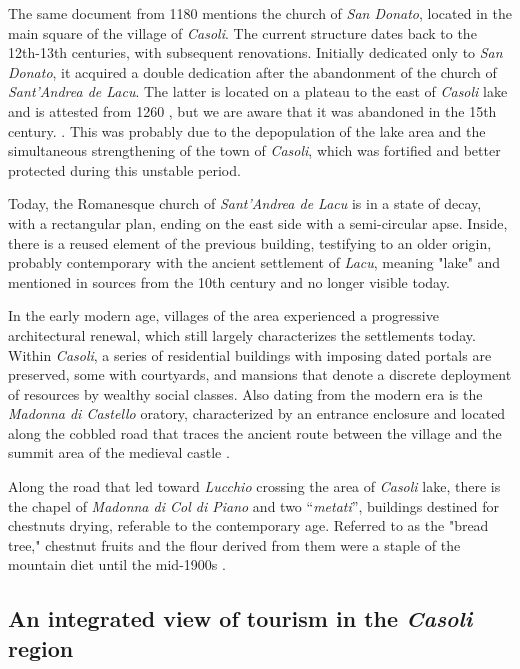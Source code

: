 \documentclass[sustainability,article,submit,pdftex,moreauthors]{Definitions/mdpi}
\begin{document}
The same document from 1180 mentions the church of \textit{San Donato}, located in the main square of the village of \emph{Casoli}. The current structure dates back to the 12th-13th centuries, with subsequent renovations. Initially dedicated only to \textit{San Donato}, it acquired a double dedication after the abandonment of the church of \textit{Sant'Andrea de Lacu}. The latter is located on a plateau to the east of \emph{Casoli} lake and is attested from 1260 \cite{ber18, gia96, cap17}, but we are aware that it was abandoned in the 15th century. \cite{gia96, con12}. This was probably due to the depopulation of the lake area and the simultaneous strengthening of the town of \emph{Casoli}, which was fortified and better protected during this unstable period.

Today, the Romanesque church of \textit{Sant'Andrea de Lacu} is in a state of decay, with a rectangular plan, ending on the east side with a semi-circular apse. Inside, there is a reused element of the previous building, testifying to an older origin, probably contemporary with the ancient settlement of \textit{Lacu}, meaning "lake" and mentioned in sources from the 10th century and no longer visible today.

In the early modern age, villages of the area experienced a progressive architectural renewal, which still largely characterizes the settlements today. Within \emph{Casoli}, a series of residential buildings with imposing dated portals are preserved, some with courtyards, and mansions that denote a discrete deployment of resources by wealthy social classes. Also dating from the modern era is the \textit{Madonna di Castello} oratory, characterized by an entrance enclosure and located along the cobbled road that traces the ancient route between the village and the summit area of the medieval castle \cite{gia96}.

Along the road that led toward \textit{Lucchio} crossing the area of \emph{Casoli} lake, there is the chapel of \textit{Madonna di Col di Piano} and two “\textit{metati}”, buildings destined for chestnuts drying, referable to the contemporary age. Referred to as the "bread tree," chestnut fruits and the flour derived from them were a staple of the mountain diet until the mid-1900s \cite{buc92, puc10}.


\subsection{An integrated view of tourism in the \emph{Casoli} region}
\end{document}

